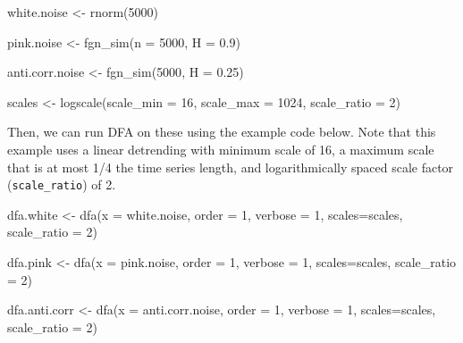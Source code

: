 \documentclass[
  man]{apa6}
\newenvironment{Shaded}{\begin{snugshade}}{\end{snugshade}}
\newcommand{\AttributeTok}[1]{\textcolor[rgb]{0.77,0.63,0.00}{#1}}
\newcommand{\DecValTok}[1]{\textcolor[rgb]{0.00,0.00,0.81}{#1}}
\newcommand{\FloatTok}[1]{\textcolor[rgb]{0.00,0.00,0.81}{#1}}
\newcommand{\FunctionTok}[1]{\textcolor[rgb]{0.00,0.00,0.00}{#1}}
\newcommand{\NormalTok}[1]{#1}
\newcommand{\OtherTok}[1]{\textcolor[rgb]{0.56,0.35,0.01}{#1}}
\begin{document}
\begin{Shaded}
\begin{Highlighting}[]
\NormalTok{white.noise }\OtherTok{\textless{}{-}} \FunctionTok{rnorm}\NormalTok{(}\DecValTok{5000}\NormalTok{)}

\NormalTok{pink.noise }\OtherTok{\textless{}{-}} \FunctionTok{fgn\_sim}\NormalTok{(}\AttributeTok{n =} \DecValTok{5000}\NormalTok{, }\AttributeTok{H =} \FloatTok{0.9}\NormalTok{)}

\NormalTok{anti.corr.noise }\OtherTok{\textless{}{-}} \FunctionTok{fgn\_sim}\NormalTok{(}\DecValTok{5000}\NormalTok{, }\AttributeTok{H =} \FloatTok{0.25}\NormalTok{)}

\NormalTok{scales }\OtherTok{\textless{}{-}} \FunctionTok{logscale}\NormalTok{(}\AttributeTok{scale\_min =} \DecValTok{16}\NormalTok{, }\AttributeTok{scale\_max =} \DecValTok{1024}\NormalTok{, }\AttributeTok{scale\_ratio =} \DecValTok{2}\NormalTok{)}
\end{Highlighting}
\end{Shaded}

Then, we can run DFA on these using the example code below. Note that
this example uses a linear detrending with minimum scale of 16, a
maximum scale that is at most 1/4 the time series length, and
logarithmically spaced scale factor (\texttt{scale\_ratio}) of 2.

\begin{Shaded}
\begin{Highlighting}[]
\NormalTok{dfa.white }\OtherTok{\textless{}{-}} \FunctionTok{dfa}\NormalTok{(}\AttributeTok{x =}\NormalTok{ white.noise, }\AttributeTok{order =} \DecValTok{1}\NormalTok{, }\AttributeTok{verbose =} \DecValTok{1}\NormalTok{, }\AttributeTok{scales=}\NormalTok{scales, }\AttributeTok{scale\_ratio =} \DecValTok{2}\NormalTok{)}

\NormalTok{dfa.pink }\OtherTok{\textless{}{-}} \FunctionTok{dfa}\NormalTok{(}\AttributeTok{x =}\NormalTok{ pink.noise, }\AttributeTok{order =} \DecValTok{1}\NormalTok{, }\AttributeTok{verbose =} \DecValTok{1}\NormalTok{,}
\AttributeTok{scales=}\NormalTok{scales, }\AttributeTok{scale\_ratio =} \DecValTok{2}\NormalTok{)}

\NormalTok{dfa.anti.corr }\OtherTok{\textless{}{-}} \FunctionTok{dfa}\NormalTok{(}\AttributeTok{x =}\NormalTok{ anti.corr.noise, }\AttributeTok{order =} \DecValTok{1}\NormalTok{, }\AttributeTok{verbose =} \DecValTok{1}\NormalTok{, }\AttributeTok{scales=}\NormalTok{scales, }\AttributeTok{scale\_ratio =} \DecValTok{2}\NormalTok{)}
\end{Highlighting}
\end{Shaded}
\end{document}
